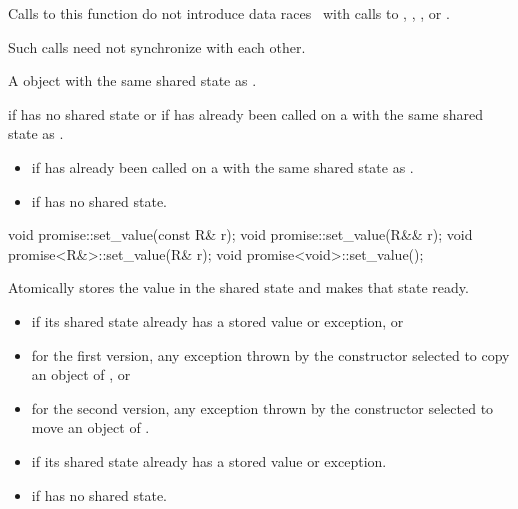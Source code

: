 \begin{itemdescr}
\pnum
\sync
Calls to this function do not introduce
data races~ with calls to
,
,
, or
.
\begin{note}
Such calls need not synchronize with each other.
\end{note}

\pnum
\returns
A  object with the same shared state as
.

\pnum
\throws
{} if  has no shared state or if
 has already been called on a  with the same
shared state as .

\pnum
\errors

\begin{itemize}
\item {} if  has already been called on
a  with the same shared state as .

\item {} if  has no shared state.
\end{itemize}
\end{itemdescr}

%
\begin{itemdecl}
void promise::set_value(const R& r);
void promise::set_value(R&& r);
void promise<R&>::set_value(R& r);
void promise<void>::set_value();
\end{itemdecl}

\begin{itemdescr}
\pnum
\effects
Atomically stores the value  in the shared state and
makes that state ready.

\pnum
\throws
\begin{itemize}
\item {} if its shared state
already has a stored value or exception, or
\item for the first version, any exception thrown by the constructor selected to copy an object of , or
\item for the second version, any exception thrown by the constructor selected to move an object of .
\end{itemize}

\pnum
\errors
\begin{itemize}
\item {} if its shared state
already has a stored value or exception.
\item {} if  has no shared state.
\end{itemize}
\end{itemdescr}

